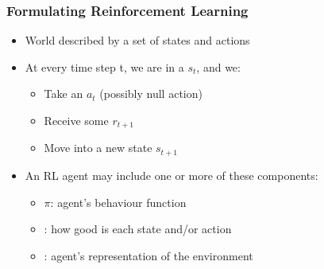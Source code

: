 \documentclass[handout]{beamer}
\begin{document}

\begin{frame}\frametitle{Formulating Reinforcement Learning}\small
\begin{itemize}
\item World described by a  set of states and actions
\item At every time step t, we are in a  $s_t$, and we:
\begin{itemize}
\item Take an  $a_t$ (possibly null action)
\item Receive some  $r_{t+1}$
\item Move into a new state $s_{t+1}$
\end{itemize}
\item An RL agent may include one or more of these components:
\begin{itemize}
\item {} $\pi$: agent's behaviour function
\item {}: how good is each state and/or action
\item {}: agent's representation of the environment
\end{itemize}
\end{itemize}
\end{frame}
\end{document}
